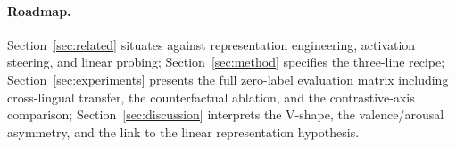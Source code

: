 \paragraph{Roadmap.}
Section~\ref{sec:related} situates \ours{} against representation
engineering, activation steering, and linear probing;
Section~\ref{sec:method} specifies the three-line recipe;
Section~\ref{sec:experiments} presents the full zero-label evaluation
matrix including cross-lingual transfer, the counterfactual ablation,
and the contrastive-axis comparison; Section~\ref{sec:discussion}
interprets the V-shape, the valence/arousal asymmetry, and the link
to the linear representation hypothesis.
